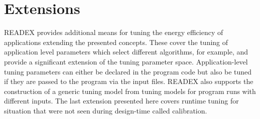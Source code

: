 \section{Extensions} \label{sec:extensions}

READEX provides additional means for tuning the energy efficiency of applications extending the presented concepts. These cover the tuning of application level parameters which select different algorithms, for example, and provide a significant extension of the tuning parameter space. Application-level tuning parameters can either be declared in the program code but also be tuned if they are passed to the program via the input files. READEX also supports the construction of a generic tuning model from tuning models for program runs with different inputs. The last extension presented here covers runtime tuning for situation that were not seen during design-time called calibration. 





